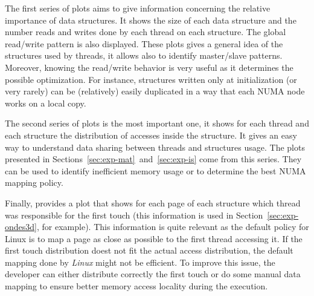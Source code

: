 The first series of plots aims to give information concerning the relative
importance of data structures. It shows the size of each data structure and the
number reads and writes done by each thread on each structure. The global
read/write pattern is also displayed. These plots gives a general idea of the
structures used by threads, it allows also to identify master/slave patterns.
Moreover, knowing the read/write behavior is very useful as it determines the
possible optimization. For instance, structures written only at initialization
(or very rarely) can be (relatively) easily duplicated in a way that each NUMA
node works on a local copy.

The second series of plots is the most important one, it shows for
each thread and each structure the distribution of accesses inside the
structure. It gives an easy way to understand data sharing between threads and
structures usage. The plots presented in Sections~\ref{sec:exp-mat}~and~\ref{sec:exp-is} come from this series. They can be used to identify inefficient memory usage or to determine the best NUMA mapping
policy.

Finally, \TABARNAC provides a plot that shows for each page of each structure
which thread was responsible for the first touch (this information is used in Section~\ref{sec:exp-ondes3d}, for example). This information is quite relevant as the default
policy for Linux is to map a page as close as possible to the first thread
accessing it. If the first touch distribution doest not fit the actual access
distribution, the default mapping done by \emph{Linux} might not be efficient.
To improve this issue, the developer can either distribute correctly the first touch or do some
manual data mapping to ensure better memory access locality during the execution.
